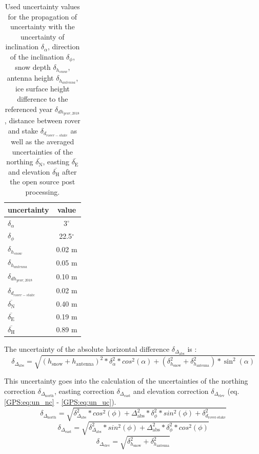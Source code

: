 \begin{table}[h]
	\caption{Used uncertainty values for the propagation of uncertainty with the uncertainty of inclination $ \delta_{\alpha} $, direction of the inclination $ \delta_{\phi} $, snow depth $ \delta_{h_{snow}}$, antenna height $ \delta_{h_{antenna}} $, ice surface height difference to the referenced year $ \delta_{dh_{year,2018}}$, distance between rover and stake $ \delta_{d_{rover-stake}} $ as well as the averaged uncertainties of the northing $ \overline{\delta_{\text{N}}} $, easting $ \overline{\delta_{\text{E}}} $ and elevation $ \overline{\delta_{\text{H}}} $ after the open source post processing.}
	\centering
	\begin{tabular}{lc}
	\toprule
        uncertainty &  value \\
	\midrule
    $ \delta_{\alpha} $ &  3$^{\circ}$ \\
    $ \delta_{\phi} $ &  22.5$^{\circ}$ \\
    $ \delta_{h_{snow}}$ &  0.02 m \\
    $ \delta_{h_{antenna}} $ &  0.05 m \\
    $ \delta_{dh_{year,2018}} $ &  0.10 m \\
    $ \delta_{d_{rover-stake}} $ &  0.02 m \\
    $ \overline{\delta_{\text{N}}} $ & 0.40 m \\
    $ \overline{\delta_{\text{E}}} $ & 0.19 m \\
    $ \overline{\delta_{\text{H}}} $ & 0.89 m \\
    \bottomrule
	\end{tabular}
	\label{GPS:tab:errors}
\end{table} 

The uncertainty of the absolute horizontal difference $\delta_{\Delta_{\text{abs}}}$ is :
\begin{equation}
	\delta_{\Delta_{\text{abs}}} = \sqrt{(h_{\text{snow}} + h_{\text{antenna}})^2 * \delta_{\alpha}^2 * cos^2(\alpha) + (\delta_{h_{\text{snow}}}^2 + \delta_{h_{\text{antenna}}}^2) * \sin^2(\alpha)}
\end{equation}

This uncertainty goes into the calculation of the uncertainties of the northing correction $\delta_{\Delta_{\text{north}}}$, easting correction $\delta_{\Delta_{\text{east}}}$ and elevation correction $\delta_{\Delta_{\text{elev}}}$ (eq. \ref{GPS:eq:un_nc} - \ref{GPS:eq:un_uc}). 
\begin{equation} \label{GPS:eq:un_nc}
	\delta_{\Delta_{\text{north}}} = \sqrt{\delta_{\Delta_{\text{abs}}}^2 * cos^2(\phi) + \Delta_{\text{abs}}^2 * \delta_{\phi}^2 * sin^2(\phi) + \delta_{d_{\text{rover-stake}}}^2}
\end{equation}
\begin{equation} \label{GPS:eq:un_ec}
	\delta_{\Delta_{\text{east}}} = \sqrt{\delta_{\Delta_{\text{abs}}}^2 * sin^2(\phi) + \Delta_{\text{abs}}^2 * \delta_{\phi}^2 * cos^2(\phi)}
\end{equation}
\begin{equation} \label{GPS:eq:un_uc}
\delta_{\Delta_{\text{elev}}} = \sqrt{\delta_{h_{\text{snow}}}^2 + \delta_{h_{\text{antenna}}}^2}
\end{equation}
	
